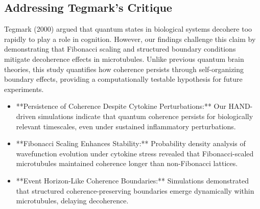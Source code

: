 \documentclass[entropy,article,submit,oneauthor,pdftex,]{Definitions/mdpi}
\begin{document}
\subsection{Addressing Tegmark's Critique}
Tegmark (2000) argued that quantum states in biological systems decohere too rapidly to play a role in cognition. However, our findings challenge this claim by demonstrating that Fibonacci scaling and structured boundary conditions mitigate decoherence effects in microtubules. Unlike previous quantum brain theories, this study quantifies how coherence persists through self-organizing boundary effects, providing a computationally testable hypothesis for future experiments.
\begin{itemize}
    \item **Persistence of Coherence Despite Cytokine Perturbations:** Our HAND-driven simulations indicate that quantum coherence persists for biologically relevant timescales, even under sustained inflammatory perturbations.
    \item **Fibonacci Scaling Enhances Stability:** Probability density analysis of wavefunction evolution under cytokine stress revealed that Fibonacci-scaled microtubules maintained coherence longer than non-Fibonacci lattices.
    \item **Event Horizon-Like Coherence Boundaries:** Simulations demonstrated that structured coherence-preserving boundaries emerge dynamically within microtubules, delaying decoherence.
\end{itemize}
\sloppy  %
\end{document}
